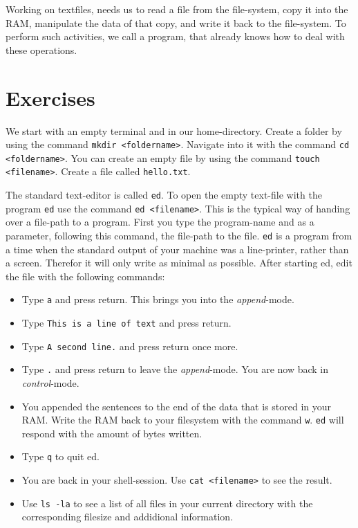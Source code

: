 \documentclass{dcbl/challenge}
\begin{document}
Working on textfiles, needs us to read a file from the file-system, copy it into the RAM, manipulate the data of that copy, and write it back to the file-system.
To perform such activities, we call a program, that already knows how to deal with these operations.

\section*{Exercises}
\begin{aufgabe}
    We start with an empty terminal and in our home-directory. 
    Create a folder by using the command \texttt{mkdir <foldername>}. 
    Navigate into it with the command \texttt{cd <foldername>}.
    You can create an empty file by using the command \texttt{touch <filename>}.
    Create a file called \texttt{hello.txt}.
\end{aufgabe}

\begin{aufgabe}
    The standard text-editor is called \texttt{ed}.
    To open the empty text-file with the program \texttt{ed} use the command \texttt{ed <filename>}.
    This is the typical way of handing over a file-path to a program. 
    First you type the program-name and as a parameter, following this command, the file-path to the file.
    \texttt{ed} is a program from a time when the standard output of your machine was a line-printer, rather than a screen. 
    Therefor it will only write as minimal as possible.
    After starting ed, edit the file with the following commands:
    \begin{itemize}
        \item Type \texttt{a} and press return. This brings you into the \textit{append}-mode.
        \item Type \texttt{This is a line of text} and press return.
        \item Type \texttt{A second line.} and press return once more.
        \item Type \texttt{.} and press return to leave the \textit{append}-mode. You are now back in \textit{control}-mode.
        \item You appended the sentences to the end of the data that is stored in your RAM. Write the RAM back to your filesystem with the command \texttt{w}. \texttt{ed} will respond with the amount of bytes written.
        \item Type \texttt{q} to quit ed.
        \item You are back in your shell-session. Use \texttt{cat <filename>} to see the result.
        \item Use \texttt{ls -la} to see a list of all files in your current directory with the corresponding filesize and addidional information.
    \end{itemize}
\end{aufgabe}
\end{document}
